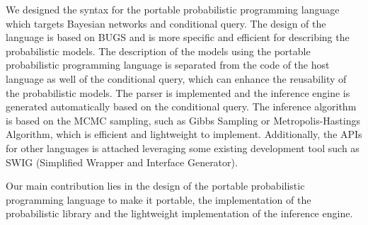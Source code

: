 We designed the syntax for the portable probabilistic programming language which targets Bayesian networks and conditional query. The design of the language is based on BUGS and is more specific and efficient for describing the probabilistic models. The description of the models using the portable probabilistic programming language is separated from the code of the host language as well of the conditional query, which can enhance the reusability of the probabilistic models. The parser is implemented and the inference engine is generated automatically based on the conditional query. The inference algorithm is based on the MCMC sampling, such as Gibbs Sampling or Metropolis-Hastings Algorithm, which is efficient and lightweight to implement. Additionally, the APIs for other languages is attached leveraging some existing development tool such as SWIG (Simplified Wrapper and Interface Generator). 

Our main contribution lies in the design of the portable probabilistic programming language to make it portable, the implementation of the probabilistic library and the lightweight implementation of the inference engine. 